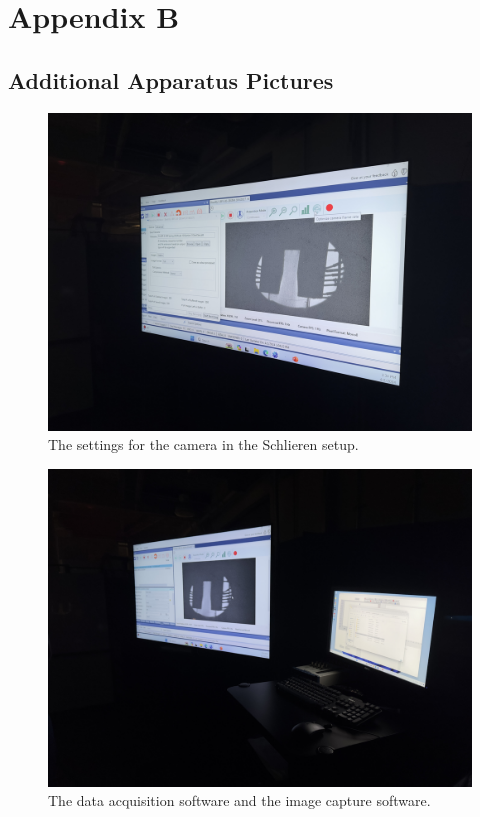 \chapter{Appendix B}

\section{Additional Apparatus Pictures} \label{sec:additional_apparatus}

\begin{figure}[htpb]
    \centering
    \includegraphics[width=0.75\linewidth]{Figures/camera_capture_settings.jpeg}
    \caption{The settings for the camera in the Schlieren setup.}
    \label{fig:camera_settings}
\end{figure}

\begin{figure}[htpb]
    \centering
    \includegraphics[width=0.75\linewidth]{Figures/data_acquisition_software.jpeg}
    \caption{The data acquisition software and the image capture software.}
    \label{fig:data_acquisition}
\end{figure}

